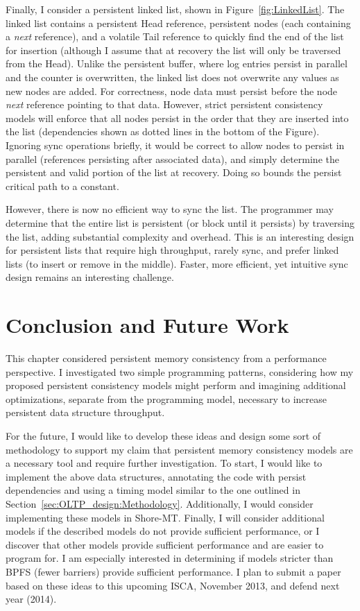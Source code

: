 

Finally, I consider a persistent linked list, shown in Figure~\ref{fig:LinkedList}.
The linked list contains a persistent Head reference, persistent nodes (each containing a \emph{next} reference), and a volatile Tail reference to quickly find the end of the list for insertion (although I assume that at recovery the list will only be traversed from the Head).
Unlike the persistent buffer, where log entries persist in parallel and the counter is overwritten, the linked list does not overwrite any values as new nodes are added.
For correctness, node data must persist before the node \emph{next} reference pointing to that data.
However, strict persistent consistency models will enforce that all nodes persist in the order that they are inserted into the list (dependencies shown as dotted lines in the bottom of the Figure).
Ignoring sync operations briefly, it would be correct to allow nodes to persist in parallel (references persisting after associated data), and simply determine the persistent and valid portion of the list at recovery.
Doing so bounds the persist critical path to a constant.

However, there is now no efficient way to sync the list.
The programmer may determine that the entire list is persistent (or block until it persists) by traversing the list, adding substantial complexity and overhead.
This is an interesting design for persistent lists that require high throughput, rarely sync, and prefer linked lists (to insert or remove in the middle).
Faster, more efficient, yet intuitive sync design remains an interesting challenge.

\section{Conclusion and Future Work}
\label{sec:PMC_patterns:Conclusion}

This chapter considered persistent memory consistency from a performance perspective.
I investigated two simple programming patterns, considering how my proposed persistent consistency models might perform and imagining additional optimizations, separate from the programming model, necessary to increase persistent data structure throughput.

For the future, I would like to develop these ideas and design some sort of methodology to support my claim that persistent memory consistency models are a necessary tool and require further investigation.
To start, I would like to implement the above data structures, annotating the code with persist dependencies and using a timing model similar to the one outlined in Section~\ref{sec:OLTP_design:Methodology}.
Additionally, I would consider implementing these models in Shore-MT.
Finally, I will consider additional models if the described models do not provide sufficient performance, or I discover that other models provide sufficient performance and are easier to program for.
I am especially interested in determining if models stricter than BPFS (fewer barriers) provide sufficient performance.
I plan to submit a paper based on these ideas to this upcoming ISCA, November 2013, and defend next year (2014).

